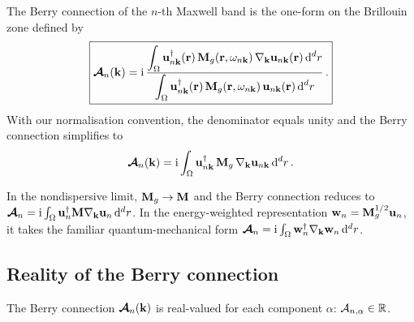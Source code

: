 \begin{definition}
  \label{def:ch5-berry-connection}
  The Berry connection of the $n$-th Maxwell band is the one-form on
  the Brillouin zone defined by
  \begin{equation}\label{eq:ch5-berry-connection}
    \boxed{%
    \Aberryvec_n(\kvec)
    = \ii\,\frac{
      \displaystyle\int_\Omega
      \mathbf{u}_{n\kvec}^\dagger(\rvec)\,
      \Mgmat(\rvec,\omega_{n\kvec})\,
      \nabla_\kvec\mathbf{u}_{n\kvec}(\rvec)\,\dd^d r
    }{
      \displaystyle\int_\Omega
      \mathbf{u}_{n\kvec}^\dagger(\rvec)\,
      \Mgmat(\rvec,\omega_{n\kvec})\,
      \mathbf{u}_{n\kvec}(\rvec)\,\dd^d r
    }\,.}
  \end{equation}
  With our normalisation convention, the denominator equals unity and
  the Berry connection simplifies to
  \begin{equation}\label{eq:ch5-berry-connection-normalised}
    \boldsymbol{\mathcal{A}}_n(\mathbf{k})
    = \mathrm{i}\int_\Omega
    \mathbf{u}_{n\mathbf{k}}^\dagger\,
    \mathbf{M}_g\,
    \nabla_{\mathbf{k}}\mathbf{u}_{n\mathbf{k}}\,\mathrm{d}^d r\,.
  \end{equation}
\end{definition}

\begin{remark}
  In the nondispersive limit, $\mathbf{M}_g\to\mathbf{M}$ and the Berry connection
  reduces to
  $\boldsymbol{\mathcal{A}}_n=\mathrm{i}\int_\Omega\mathbf{u}_n^\dagger\mathbf{M}
  \nabla_{\mathbf{k}}\mathbf{u}_n\,\mathrm{d}^d r$.  In the energy-weighted
  representation $\mathbf{w}_n=\mathbf{M}_g^{1/2}\mathbf{u}_n$, it takes the
  familiar quantum-mechanical form
  $\boldsymbol{\mathcal{A}}_n=\mathrm{i}\int_\Omega\mathbf{w}_n^\dagger
  \nabla_{\mathbf{k}}\mathbf{w}_n\,\mathrm{d}^d r$.
\end{remark}

\subsection{Reality of the Berry connection}
\label{sec:ch5-bc-real}

\begin{proposition}
  The Berry connection $\boldsymbol{\mathcal{A}}_n(\mathbf{k})$ is real-valued for each
  component $\alpha$: $\mathcal{A}_{n,\alpha}\in\mathbb{R}$.
\end{proposition}

